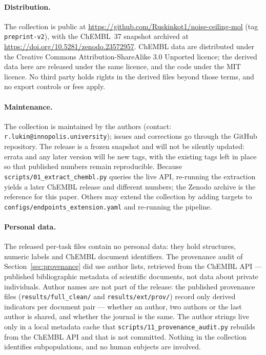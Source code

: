 \paragraph{Distribution.} {\sloppy The collection is public at \url{https://github.com/Ruskinkot1/noise-ceiling-mol} (tag \texttt{preprint-v2}), with the ChEMBL~37 snapshot archived at \url{https://doi.org/10.5281/zenodo.23572957}. ChEMBL data are distributed under the Creative Commons Attribution-ShareAlike 3.0 Unported licence; the derived data here are released under the same licence, and the code under the MIT licence. No third party holds rights in the derived files beyond those terms, and no export controls or fees apply.\par}

\paragraph{Maintenance.} {\sloppy The collection is maintained by the authors (contact: \texttt{r.lukin@innopolis.university}); issues and corrections go through the GitHub repository. The release is a frozen snapshot and will not be silently updated: errata and any later version will be new tags, with the existing tags left in place so that published numbers remain reproducible. Because \texttt{scripts/01\_extract\_chembl.py} queries the live API, re-running the extraction yields a later ChEMBL release and different numbers; the Zenodo archive is the reference for this paper. Others may extend the collection by adding targets to \texttt{configs/endpoints\_extension.yaml} and re-running the pipeline.\par}

\paragraph{Personal data.} The released per-task files contain no personal data: they hold structures, numeric labels and ChEMBL document identifiers. The provenance audit of Section~\ref{sec:provenance} did use author lists, retrieved from the ChEMBL API --- published bibliographic metadata of scientific documents, not data about private individuals. Author names are not part of the release: the published provenance files (\texttt{results/}\allowbreak\texttt{full\_clean/} and \texttt{results/ext/prov/}) record only derived indicators per document pair --- whether an author, two authors or the last author is shared, and whether the journal is the same. The author strings live only in a local metadata cache that \texttt{scripts/11\_provenance\_audit.py} rebuilds from the ChEMBL API and that is not committed. Nothing in the collection identifies subpopulations, and no human subjects are involved.
